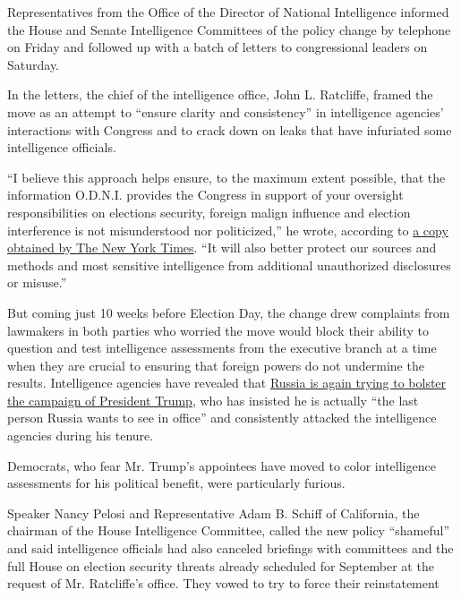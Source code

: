 Representatives from the Office of the Director of National Intelligence
informed the House and Senate Intelligence Committees of the policy
change by telephone on Friday and followed up with a batch of letters to
congressional leaders on Saturday.

In the letters, the chief of the intelligence office, John L. Ratcliffe,
framed the move as an attempt to ``ensure clarity and consistency'' in
intelligence agencies' interactions with Congress and to crack down on
leaks that have infuriated some intelligence officials.

``I believe this approach helps ensure, to the maximum extent possible,
that the information O.D.N.I. provides the Congress in support of your
oversight responsibilities on elections security, foreign malign
influence and election interference is not misunderstood nor
politicized,'' he wrote, according to
\href{https://int.graylady3jvrrxbe.onion/data/documenttools/letter-from-the-office-of-the-director-of-national-intelligence/728f2b21d6a4b371/full.pdf}{a
copy obtained by The New York Times}. ``It will also better protect our
sources and methods and most sensitive intelligence from additional
unauthorized disclosures or misuse.''

But coming just 10 weeks before Election Day, the change drew complaints
from lawmakers in both parties who worried the move would block their
ability to question and test intelligence assessments from the executive
branch at a time when they are crucial to ensuring that foreign powers
do not undermine the results. Intelligence agencies have revealed that
\href{https://www.nytimes3xbfgragh.onion/2020/08/07/us/politics/russia-china-trump-biden-election-interference.html}{Russia
is again trying to bolster the campaign of President Trump}, who has
insisted he is actually ``the last person Russia wants to see in
office'' and consistently attacked the intelligence agencies during his
tenure.

Democrats, who fear Mr. Trump's appointees have moved to color
intelligence assessments for his political benefit, were particularly
furious.

Speaker Nancy Pelosi and Representative Adam B. Schiff of California,
the chairman of the House Intelligence Committee, called the new policy
``shameful'' and said intelligence officials had also canceled briefings
with committees and the full House on election security threats already
scheduled for September at the request of Mr. Ratcliffe's office. They
vowed to try to force their reinstatement

